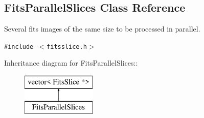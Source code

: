 \subsection{Fits\-Parallel\-Slices  Class Reference}
\label{class_fitsparallelslices}
Several fits images of the same size to be processed in parallel. 


{\tt \#include $<$fitsslice.h$>$}

Inheritance diagram for Fits\-Parallel\-Slices::\begin{figure}[H]
\begin{center}
\leavevmode
\includegraphics[height=2cm]{class_fitsparallelslices}
\end{center}
\end{figure}
